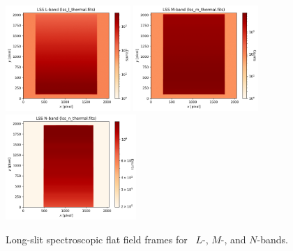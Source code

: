 \begin{figure}[!h]
\centering
  \includegraphics[height=4cm,keepaspectratio]{figures/LSS_CrtAlg_files/lss_l_thermal.fits.png}
  \includegraphics[height=4cm,keepaspectratio]{figures/LSS_CrtAlg_files/lss_m_thermal.fits.png}
  \includegraphics[height=4cm,keepaspectratio]{figures/LSS_CrtAlg_files/lss_n_thermal.fits.png}
  \caption{Long-slit spectroscopic flat field frames for \lss~$L$-, $M$-, and $N$-bands.} 
  \label{fig:ff}
\end{figure}

